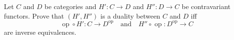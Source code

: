 Let $C$ and $D$ be categories and $H': C \to D$ and $H'': D \to C$ be contravariant functors. Prove that $(H', H'')$ is a duality between $C$ and $D$ iff
$$\operatorname{op} \circ H': C \to D^{\operatorname{op}} \quad \text{and} \quad H'' \circ \operatorname{op}: D^{\operatorname{op}} \to C$$
are inverse equivalences.
